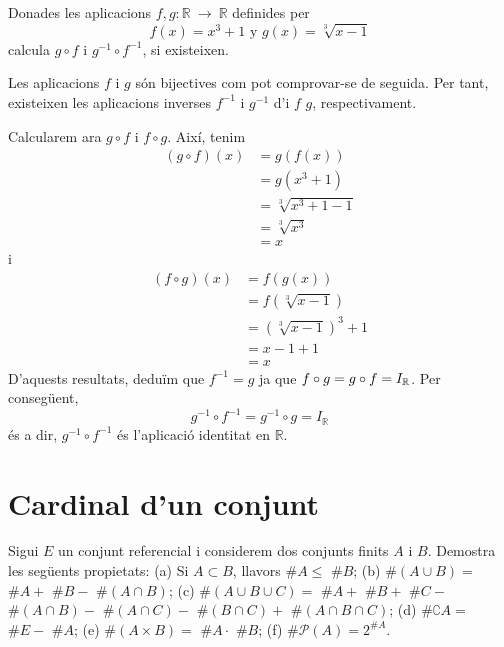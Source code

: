 \begin{exercici}
Donades les aplicacions $f,g:\mathbb{R}~\longrightarrow ~\mathbb{R}$
definides per%
\begin{equation*}
f(x)=x^{3}+1\text{ \ \ \ \ y \ \ \ \ }g(x)=\sqrt[3]{x-1}
\end{equation*}%
calcula $g\circ f$ i $g^{-1}\circ f^{-1}$, si existeixen.
\end{exercici}

\begin{solucio}
Les aplicacions $f$ i $g$ són bijectives com pot comprovar-se de
seguida. Per tant, existeixen les aplicacions inverses $f^{-1}$ i $g^{-1}$
d'i $f$ $g$, respectivament.

Calcularem ara $g\circ f$ i $f\circ g$. Així, tenim%
\begin{align*}
(g\circ f)(x)& =g\left( f(x)\right) \\
& =g(x^{3}+1) \\
& =\sqrt[3]{x^{3}+1-1} \\
& =\sqrt[3]{x^{3}} \\
& =x
\end{align*}%
i%
\begin{align*}
(f\circ g)(x)& =f\left( g(x)\right) \\
& =f\left( \sqrt[3]{x-1}\right) \\
& =\left( \sqrt[3]{x-1}\right) ^{3}+1 \\
& =x-1+1 \\
& =x
\end{align*}%
D'aquests resultats, deduïm que $f^{-1}=g$ ja que $f\circ g=g\circ f=I_{%
\mathbb{R}}$. Per consegüent,%
\begin{equation*}
g^{-1}\circ f^{-1}=g^{-1}\circ g=I_{\mathbb{R}}
\end{equation*}%
és a dir, $g^{-1}\circ f^{-1}$ és l'aplicació identitat en $%
\mathbb{R}$.
\end{solucio}

\section{Cardinal d'un conjunt}

\begin{exercici}
Sigui $E$ un conjunt referencial i considerem dos conjunts finits $A$ i $B$.
Demostra les següents propietats: (a) Si $A\subset B$, llavors $\#A\leq $
$\#B$; (b) $\#\left( A\cup B\right) =$ $\#A+$ $\#B-$ $\#\left( A\cap
B\right) $; (c) $\#\left( A\cup B\cup C\right) =$ $\#A+$ $\#B+$ $\#C-$ $%
\#\left( A\cap B\right) -$ $\#\left( A\cap C\right) -$ $\#\left( B\cap
C\right) +$ $\#\left( A\cap B\cap C\right) $; (d) $\#\complement A=$ $\#E-$ $%
\#A$; (e) $\#\left( A\times B\right) =$ $\#A\cdot $ $\#B$; (f) $\#\mathcal{P}%
(A)=2^{\#A}$.
\end{exercici}

